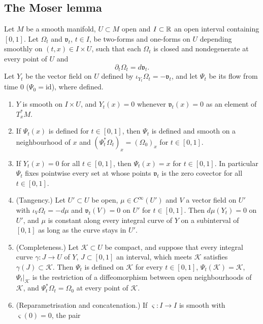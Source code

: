 \subsection{The Moser lemma}\label{sec:pre-moser}

\begin{lemma}\label{lem:pre-moser}
Let $M$ be a smooth manifold, $U\subset M$ open and $I\subset\mathbb{R}$ an open interval containing $[0,1]$. Let $\Omega_t$ and
$\mathfrak v_t$, $t\in I$, be two-forms and one-forms on $U$ depending smoothly on $(t,x)\in I\times U$, such that each
$\Omega_t$ is closed and nondegenerate at every point of $U$ and
\[
 \partial_t\Omega_t=d\mathfrak v_t .
\]
Let $Y_t$ be the vector field on $U$ defined by $\iota_{Y_t}\Omega_t=-\mathfrak v_t$, and let $\Psi_t$ be its flow from time $0$
($\Psi_0=\mathrm{id}$), where defined.
\begin{enumerate}[label=(\alph*)]
\item $Y$ is smooth on $I\times U$, and $Y_t(x)=0$ whenever $\mathfrak v_t(x)=0$ as an element of $T_x^*M$.
\item If $\Psi_t(x)$ is defined for $t\in[0,1]$, then $\Psi_t$ is defined and smooth on a neighbourhood of $x$ and
$(\Psi_t^*\Omega_t)_x=(\Omega_0)_x$ for $t\in[0,1]$.
\item If $Y_t(x)=0$ for all $t\in[0,1]$, then $\Psi_t(x)=x$ for $t\in[0,1]$. In particular $\Psi_t$ fixes pointwise every set
at whose points $\mathfrak v_t$ is the zero covector for all $t\in[0,1]$.
\item (Tangency.) Let $U'\subset U$ be open, $\mu\in C^\infty(U')$ and $V$ a vector field on $U'$ with
$\iota_V\Omega_t=-d\mu$ and $\mathfrak v_t(V)=0$ on $U'$ for $t\in[0,1]$. Then $d\mu(Y_t)=0$ on $U'$, and $\mu$ is constant along
every integral curve of $Y$ on a subinterval of $[0,1]$ as long as the curve stays in $U'$.
\item (Completeness.) Let $\mathcal K\subset U$ be compact, and suppose that every integral curve $\gamma\colon J\to U$ of $Y$,
$J\subset[0,1]$ an interval, which meets $\mathcal K$ satisfies $\gamma(J)\subset\mathcal K$. Then $\Psi_t$ is defined on $\mathcal K$ for
every $t\in[0,1]$, $\Psi_t(\mathcal K)=\mathcal K$, $\Psi_t|_{\mathcal K}$ is the restriction of a diffeomorphism between open
neighbourhoods of $\mathcal K$, and $\Psi_t^*\Omega_t=\Omega_0$ at every point of $\mathcal K$.
\item (Reparametrisation and concatenation.) If $\varsigma\colon I\to I$ is smooth with $\varsigma(0)=0$, the pair

\end{enumerate}
\end{lemma}

